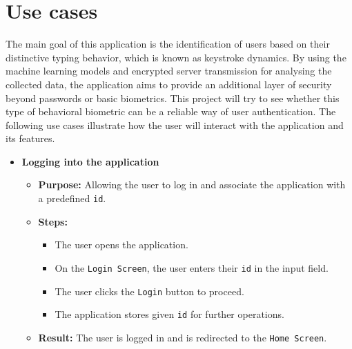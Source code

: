 
\section{Use cases}
The main goal of this application is the identification of users based on their distinctive typing behavior, which is known as keystroke dynamics. By using the machine learning models and encrypted server transmission for analysing the collected data, the application aims to provide an additional layer of security beyond passwords or basic biometrics. This project will try to see whether this type of behavioral biometric can be a reliable way of user authentication. \newline
The following use cases illustrate how the user will interact with the application and its features.

\begin{itemize}
	\item \textbf{Logging into the application}
	\begin{itemize}
		\item \textbf{Purpose:} Allowing the user to log in and associate the application with a predefined \texttt{id}.
		\item \textbf{Steps:}
		\begin{itemize}
			\item The user opens the application.
			\item On the \texttt{Login Screen}, the user enters their \texttt{id} in the input field.
			\item The user clicks the \texttt{Login} button to proceed.
			\item The application stores given \texttt{id} for further operations.
		\end{itemize}
		\item \textbf{Result:} The user is logged in and is redirected to the \texttt{Home Screen}.
	\end{itemize}
	

\end{itemize}
